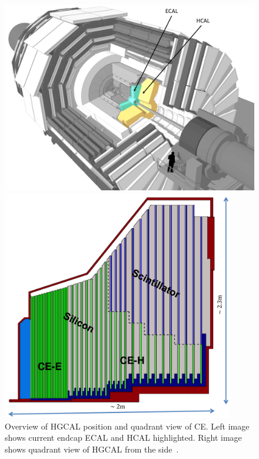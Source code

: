 \begin{figure}[!ht]
  \centering
  \begin{minipage}[c]{0.49\textwidth}
    \includegraphics[width=\textwidth]{figures/hgcal/hgcal_place.pdf}
  \end{minipage}
  \begin{minipage}[c]{0.49\textwidth}
    \includegraphics[width=0.9\textwidth]{figures/hgcal/hgcal_quadrant.pdf}
  \end{minipage}
  \caption[Overview of HGCAL position and quadrant view of CE]%
  {Overview of HGCAL position and quadrant view of \gls{CE}. Left image
    shows current endcap \gls{ECAL} and \gls{HCAL} highlighted.
    Right image shows quadrant view of \gls{HGCAL} from the side~\cite{image-cms-hgcal-quadrant-layout,image-cms-hgcal-place}.}%
  \label{fig:cms-hgcal-quadrant-layout}
\end{figure}

